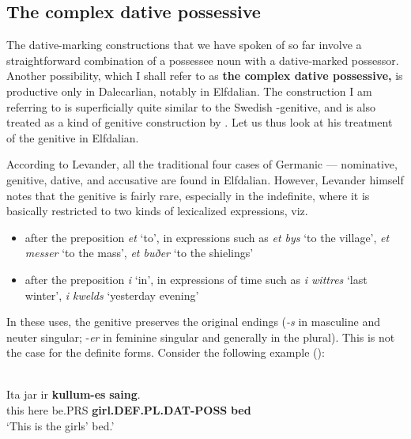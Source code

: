 \subsection{The complex dative possessive}
\label{bkm:Ref224373337}

The dative-marking constructions that we have spoken of so far involve a straightforward combination of a possessee noun with a dative-marked possessor. Another possibility, which I shall refer to as \textbf{the complex dative possessive,} is productive only in Dalecarlian, notably in Elfdalian. The construction I am referring to is superficially quite similar to the Swedish -genitive, and is also treated as a kind of genitive construction by \citet{Levander1909}. Let us thus look at his treatment of the genitive in Elfdalian.

According to Levander, all the traditional four cases of Germanic — nominative, genitive, dative, and accusative are found in Elfdalian. However, Levander himself notes that the genitive is fairly rare, especially in the indefinite, where it is basically restricted to two kinds of lexicalized expressions, viz. 

\begin{itemize}
\item after the preposition \textit{et} ‘to’, in expressions such as \textit{et bys} ‘to the village’, \textit{et messer} ‘to the mass’, \textit{et buðer} ‘to the shielings’
\item after the preposition \textit{i} ‘in’, in expressions of time such as \textit{i wittres} ‘last winter’, \textit{i kwelds }‘yesterday evening’
\end{itemize}



In these uses, the genitive preserves the original endings (\textit{\nobreakdash-s }in masculine and neuter singular; \nobreakdash-\textit{er} in feminine singular and generally in the plural). This is not the case for the definite forms. Consider the following example (\citet[96]{Levander1909}):


\ea\label{}
\\
\gll Ita  jar  ir  \textbf{kullum-es} \textbf{saing}.\\
this  here  be.PRS  \textbf{girl.DEF.PL.DAT-POSS} \textbf{bed}\\
\glt ‘This is the girls’ bed.’
\z

